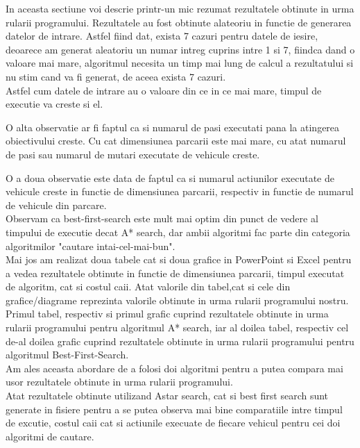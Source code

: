 \documentclass{article}
\begin{document}
\begin{flushleft}
\quad In aceasta sectiune voi descrie printr-un mic rezumat rezultatele obtinute in urma rularii programului. Rezultatele au fost obtinute alateoriu in functie de generarea datelor de intrare. Astfel fiind dat, exista 7 cazuri pentru datele de iesire, deoarece am generat aleatoriu un numar intreg cuprins intre 1 si 7, fiindca dand o valoare mai mare, algoritmul necesita un timp mai lung de calcul a rezultatului si nu stim cand va fi generat, de aceea exista 7 cazuri.\\ Astfel cum datele de intrare au o valoare din ce in ce mai mare, timpul de executie va creste si el. \par
\begin{flushleft}
\quad O alta observatie ar fi faptul ca si numarul de pasi executati pana la atingerea obiectivului creste. Cu cat dimensiunea parcarii este mai mare, cu atat numarul de pasi sau numarul de mutari executate de vehicule creste.\par \quad O a doua observatie este data de faptul ca si numarul actiunilor executate de vehicule creste in functie de dimensiunea parcarii, respectiv in functie de numarul de vehicule din parcare. 
\newline\\
\quad Observam ca best-first-search este mult mai optim din punct de vedere al
timpului de executie decat A* search, dar ambii algoritmi fac parte din categoria algoritmilor "cautare intai-cel-mai-bun".
\newline \\
Mai jos am realizat doua tabele cat si doua grafice in PowerPoint si Excel pentru a vedea rezultatele obtinute in functie de dimensiunea parcarii, timpul executat de algoritm, cat si costul caii. Atat valorile din tabel,cat si cele din grafice/diagrame reprezinta valorile obtinute in urma rularii programului nostru.
\newline\\ 
Primul tabel, respectiv si primul grafic cuprind rezultatele obtinute in urma rularii programului pentru algoritmul A* search, iar al doilea tabel, respectiv cel de-al doilea grafic cuprind rezultatele obtinute in urma rularii programului pentru algoritmul Best-First-Search.\\ Am ales aceasta abordare de a folosi doi algoritmi pentru a putea compara mai usor rezultatele obtinute in urma rularii programului. 
\newline\\ 
\quad Atat rezultatele obtinute utilizand Astar search, cat si best first search sunt generate in fisiere pentru a se putea observa mai bine comparatiile intre timpul de excutie, costul caii cat si actiunile execuate de fiecare vehicul pentru cei doi algoritmi de cautare.\par


\end{flushleft}
\end{flushleft}
\end{document}
